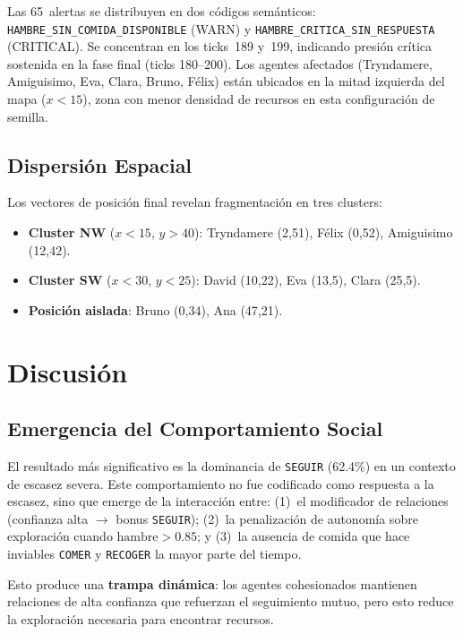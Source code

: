 \documentclass[11pt,a4paper,twocolumn]{article}
\begin{document}
Las 65~alertas se distribuyen en dos c\'odigos sem\'anticos:
\texttt{HAMBRE\_SIN\_COMIDA\_DISPONIBLE} (WARN) y
\texttt{HAMBRE\_CRITICA\_SIN\_RESPUESTA} (CRITICAL).
Se concentran en los ticks~189 y~199, indicando presi\'on cr\'itica
sostenida en la fase final (ticks 180--200).
Los agentes afectados (Tryndamere, Amiguisimo, Eva, Clara, Bruno,
F\'elix) est\'an ubicados en la mitad izquierda del mapa ($x<15$),
zona con menor densidad de recursos en esta configuraci\'on de semilla.

\subsection{Dispersi\'on Espacial}

Los vectores de posici\'on final revelan fragmentaci\'on en tres
clusters:

\begin{itemize}[leftmargin=1em, itemsep=2pt, topsep=2pt]
  \item \textbf{Cluster NW} ($x<15$, $y>40$): Tryndamere (2,51),
        F\'elix (0,52), Amiguisimo (12,42).
  \item \textbf{Cluster SW} ($x<30$, $y<25$): David (10,22),
        Eva (13,5), Clara (25,5).
  \item \textbf{Posici\'on aislada}: Bruno (0,34), Ana (47,21).
\end{itemize}

\section{Discusi\'on}

\subsection{Emergencia del Comportamiento Social}

El resultado m\'as significativo es la dominancia de \texttt{SEGUIR}
(62.4\%) en un contexto de escasez severa. Este comportamiento no fue
codificado como respuesta a la escasez, sino que emerge de la
interacci\'on entre: (1)~el modificador de relaciones (confianza alta
$\to$ bonus \texttt{SEGUIR}); (2)~la penalizaci\'on de autonom\'ia
sobre exploraci\'on cuando $\text{hambre}>0.85$; y (3)~la ausencia de
comida que hace inviables \texttt{COMER} y \texttt{RECOGER} la mayor
parte del tiempo.

Esto produce una \textbf{trampa din\'amica}: los agentes cohesionados
mantienen relaciones de alta confianza que refuerzan el seguimiento
mutuo, pero esto reduce la exploraci\'on necesaria para encontrar
recursos.
\end{document}
